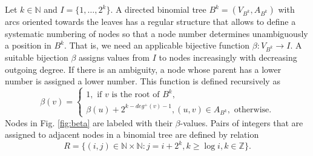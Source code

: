 Let $k\in \mathbb{N}$ and $I=\{1,\dots,2^k\}$. 
A directed binomial tree $B^k=(V_{B^k},A_{B^k})$ with arcs oriented towards the leaves has a regular structure that allows to define a systematic numbering of nodes so that a node number determines unambiguously a position in $B^k$.
That is, we need an applicable bijective function $\beta:V_{B^k}\to I$.
A suitable bijection $\beta$ assigns values from $I$ to nodes increasingly with decreasing outgoing degree.
If there is an ambiguity, a node whose parent has a lower number is assigned a lower number.
This function is defined recursively as
\begin{equation*}
\label{eq:beta}
\beta(v)=\begin{cases}
1,\text{ if } v \text{ is the root of } B^k,\\
\beta(u) + 2^{k-deg^+(v)-1}, (u,v)\in A_{B^k},\text{ otherwise}.
\end{cases}
\end{equation*}
Nodes in Fig. \ref{fig:beta} are labeled with their $\beta$-values.
Pairs of integers that are assigned to adjacent nodes in a binomial tree are defined by relation
\begin{equation*}
\label{eq:betarel}
R=\{(i,j)\in\mathbb{N}\times\mathbb{N}:j=i+2^k,k\geq\log i,k\in \mathbb{Z}\}.
\end{equation*}

